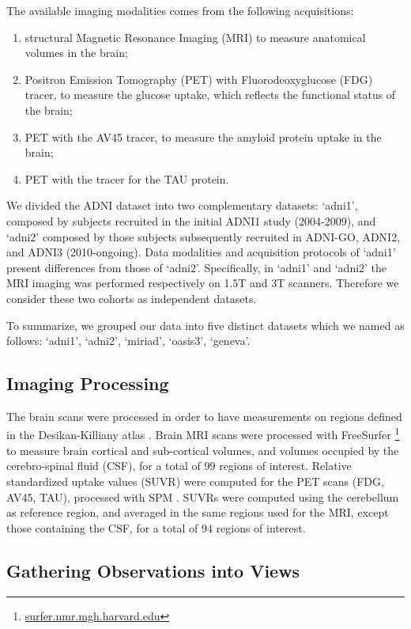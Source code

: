 The available imaging modalities comes from the following acquisitions:
%
\begin{enumerate}
\item structural Magnetic Resonance Imaging (MRI) to measure anatomical volumes in the brain;
%
\item Positron Emission Tomography (PET) with Fluorodeoxyglucose (FDG) tracer, to measure the glucose uptake, which reflects the functional status of the brain;
\item PET with the AV45 tracer, to measure the amyloid protein uptake in the brain;
\item PET with the tracer for the TAU protein.
\end{enumerate}
%

We divided the ADNI dataset into two complementary datasets:
`adni1', composed by subjects recruited in the initial ADNI1 study (2004-2009),
and `adni2' composed by those subjects subsequently recruited in ADNI-GO, ADNI2, and ADNI3 (2010-ongoing).
Data modalities and acquisition protocols of `adni1' present differences from those of `adni2'.
Specifically, in `adni1' and `adni2' the MRI imaging was performed respectively on 1.5T and 3T scanners.
Therefore we consider these two cohorts as independent datasets.

To summarize, we grouped our data into five distinct datasets which we named as follows: `adni1', `adni2', `miriad', `oasis3', `geneva'.

\subsection{Imaging Processing}
The brain scans were processed in order to have measurements on regions defined in the Desikan-Killiany atlas \citep{Desikan2006}.
Brain MRI scans were processed with FreeSurfer \footnote{\href{https://surfer.nmr.mgh.harvard.edu/}{surfer.nmr.mgh.harvard.edu}} \citep{freesurfer} to measure brain cortical and sub-cortical volumes, and volumes occupied by the cerebro-spinal fluid (CSF), for a total of $99$ regions of interest.
Relative standardized uptake values (SUVR) were computed for the PET scans (FDG, AV45, TAU), processed with SPM \citep{Ashburner2000}.
SUVRs were computed using the cerebellum as reference region, and averaged in the same regions used for the MRI, except those containing the CSF, for a total of $94$ regions of interest.

\subsection{Gathering Observations into Views}
\label{ssec:views}


